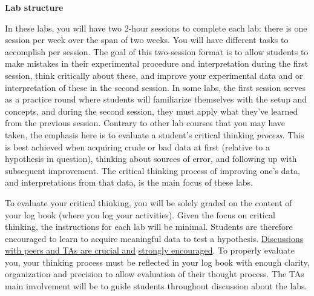 \documentclass[12pt]{report}
\begin{document}

\noindent \large \textbf{Lab structure} \normalsize

In these labs, you will have two 2-hour sessions to complete each lab: there is one session per week over the span of two weeks. 
You will have different tasks to accomplish per session. The goal of this two-session format is to allow students to make mistakes in their experimental procedure and interpretation during the first session, think critically about these, and improve your experimental data and or interpretation of these in the second session. 
In some labs, the first session serves as a practice round where students will familiarize themselves with the setup and concepts, and during the second session, they must apply what they've learned from the previous session.
Contrary to other lab courses that you may have taken, the emphasis here is to evaluate a student's critical thinking \textit{process}. This is best achieved when acquiring crude or bad data at first (relative to a hypothesis  in question), thinking about sources of error, and following up with subsequent improvement. 
The critical thinking process of improving one's data, and interpretations from that data, is the main focus of these labs.

To evaluate your critical thinking, you will be solely graded on the content of your log book (where you log your activities).
Given the focus on critical thinking, the instructions for each lab will be minimal. 
Students are therefore encouraged to learn to acquire meaningful data to test a hypothesis. \underline{Discussions with peers and TAs are crucial and} \underline{strongly encouraged}. 
To properly evaluate you, your  thinking process must  be reflected in your log book with enough clarity, organization and precision to allow  evaluation of their thought process. The TAs main involvement will be to guide students throughout discussion about the labs. 
\end{document}
